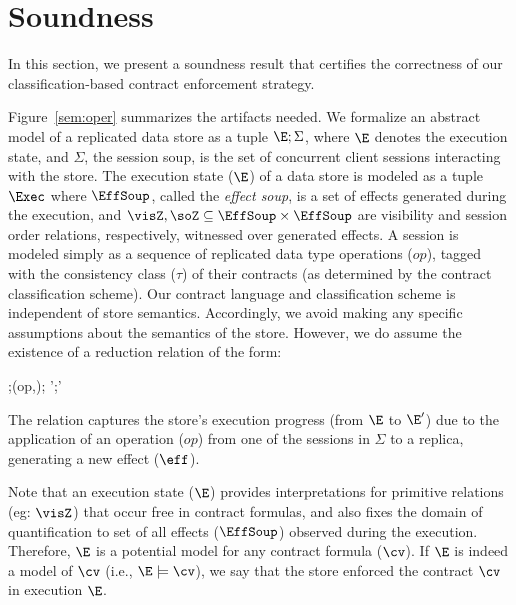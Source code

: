 \section{Soundness}
\label{sec:core-opsem}

In this section, we present a soundness result that certifies
the correctness of our classification-based contract enforcement
strategy.

Figure~\ref{sem:oper} summarizes the artifacts needed. We formalize an abstract
model of a replicated data store as a tuple $\E;\Sigma$, where $\E$ denotes the
execution state, and $\Sigma$, the session soup, is the set of concurrent
client sessions interacting with the store. The execution state ($\E$) of a
data store is modeled as a tuple $\Exec$ where $\EffSoup$, called the
\emph{effect soup}, is a set of effects generated during the execution, and
$\visZ,\soZ \subseteq \EffSoup \times \EffSoup$ are visibility and session
order relations, respectively, witnessed over generated effects. A session is
modeled simply as a sequence of replicated data type operations ($op$), tagged
with the consistency class ($\tau$) of their contracts (as determined by the
contract classification scheme). Our contract language and classification
scheme is independent of store semantics. Accordingly, we avoid making any
specific assumptions about the semantics of the store. However, we do assume
the existence of a reduction relation of the form:

\begin{smathpar}
  \auxred{} {\E;\langle (op,\tau);\sigma \rangle \pll \Sigma} {\eff}
    {\E';\langle \sigma \rangle \pll \Sigma'}
\end{smathpar}

\noindent The relation captures the store's execution progress (from
$\E$ to $\E'$) due to the application of an operation ($op$) from one
of the sessions in $\Sigma$ to a replica, generating a new effect
($\eff$).

Note that an execution state ($\E$) provides interpretations for
primitive relations (eg: $\visZ$) that occur free in contract
formulas, and also fixes the domain of quantification to set of all
effects ($\EffSoup$) observed during the execution. Therefore, $\E$ is
a potential model for any contract formula ($\cv$). If $\E$ is indeed
a model of $\cv$ (i.e., $\E \models \cv$), we say that the store
enforced the contract $\cv$ in execution $\E$.

